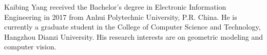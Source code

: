 \documentclass[journal]{IEEEtran}
\begin{document}









%
%



% 


\begin{IEEEbiography}{Kaibing Yang} received the Bachelor's degree in Electronic Information Engineering in 2017 from Anhui Polytechnic University, P.R. China. He is currently a graduate student in the College of Computer Science and Technology, Hangzhou Dianzi University. His research interests are on geometric modeling and computer vision.
\end{IEEEbiography}
\end{document}
